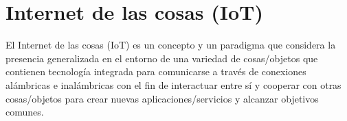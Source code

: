 \section{Internet de las cosas (IoT)}
	El Internet de las cosas (IoT) es un concepto y un paradigma que considera la presencia generalizada en el entorno de una variedad de cosas/objetos que contienen tecnología integrada para comunicarse a través de conexiones alámbricas e inalámbricas con el fin de interactuar entre sí y cooperar con otras cosas/objetos para crear nuevas aplicaciones/servicios y alcanzar objetivos comunes.